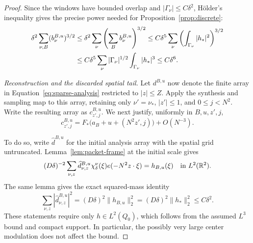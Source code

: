 \begin{proof}
Since the windows have bounded overlap and
$|\Gamma_\nu|\leq C\delta^2$, H\"older's inequality gives the
precise power needed for Proposition~\ref{prop:discrete}:
\begin{align}
 \delta^2\sum_{\nu,B}(b_\nu^{B,u})^{3/2}
 &\leq\delta^2\sum_\nu\left(\sum_B b_\nu^{B,u}\right)^{3/2}
 \leq C\delta^5\sum_\nu
              \left(\int_{\Gamma_\nu}|h_*|^2\right)^{3/2}
 \notag\\
 &\leq C\delta^5\sum_\nu |\Gamma_\nu|^{1/2}
                     \int_{\Gamma_\nu}|h_*|^3
 \leq C\delta^6.                                      \label{eq:sparse-l3-mass}
\end{align}

\emph{Reconstruction and the discarded spatial tail.}
Let $d^{B,u}$ now denote the finite array in
Equation~\eqref{eq:sparse-analysis} restricted to $|z|\leq Z$.
Apply the synthesis and sampling map to this array, retaining only
$\nu'=\nu_*$, $|z'|\leq1$, and $0\leq j<N^2$.  Write the resulting
array as $c^{B,u}_{z',j}$.  We next justify, uniformly in $B,u,z',j$,
\begin{equation}\label{eq:sparse-samples}
 c^{B,u}_{z',j}
 =F_*\big(a_B+u+(N^2z',j)\big)+O(N^{-3}).
\end{equation}

To do so, write $\widehat d^{B,u}$ for the initial analysis array
with the spatial grid untruncated. Lemma~\ref{lem:packet-frame}
at the initial scale gives
\begin{equation}\label{eq:sparse-full-frame}
 (D\delta)^{-2}\sum_{\nu,z}
       \widehat d^{B,u}_{\nu,z}\chi_\delta^\nu(\xi)
                       e(-N^2z\cdot\xi)=h_{B,u}(\xi)
       \quad\hbox{in }L^2(\mathbb R^2).
\end{equation}
The same lemma gives the exact squared-mass identity
\begin{equation}\label{eq:sparse-full-mass}
 \sum_{\nu,z}|\widehat d^{B,u}_{\nu,z}|^2
  =(D\delta)^2\|h_{B,u}\|_2^2
  =(D\delta)^2\|h_*\|_2^2\leq C\delta^2.
\end{equation}
These statements require only $h\in L^2(Q_0)$, which follows from
the assumed $L^3$ bound and compact support.  In particular, the
possibly very large center modulation does not affect the bound.


\end{proof}
